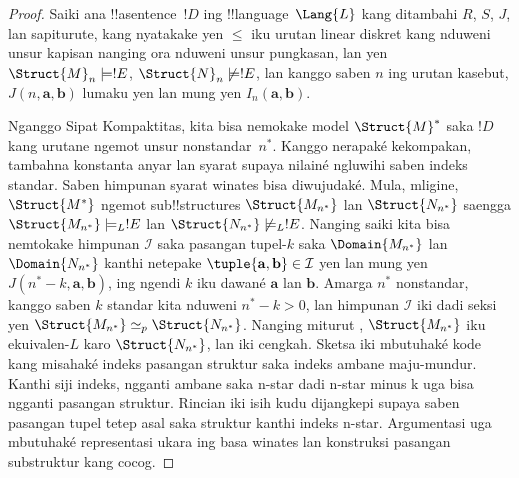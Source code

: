 \documentclass[../../../include/open-logic-section]{subfiles}
\begin{document}
\begin{proof}
Saiki ana !!a{sentence}~$!D$ ing !!{language}~$\Lang{L}$ kang
ditambahi $R$, $S$, $J$, lan sapiturute, kang nyatakake yen
$\le$ iku urutan linear diskret kang nduweni unsur kapisan
nanging ora nduweni unsur pungkasan, lan yen
$\Struct{M}_n \models !E$, $\Struct{N}_n \not\models !E$,
lan kanggo saben $n$ ing urutan kasebut,
$J(n, \mathbf{a}, \mathbf{b})$ lumaku yen lan mung yen
$I_n(\mathbf{a}, \mathbf{b})$.

Nganggo Sipat Kompaktitas, kita bisa nemokake model
$\Struct{M}^*$ saka $!D$ kang urutane ngemot unsur
nonstandar~$n^*$. Kanggo nerapaké kekompakan, tambahna konstanta anyar lan syarat supaya nilainé ngluwihi saben indeks standar. Saben himpunan syarat winates bisa diwujudaké. Mula, mligine, $\Struct{M^*}$ ngemot
sub!!{structure}s $\Struct{M_{n^*}}$ lan
$\Struct{N_{n^*}}$ saengga $\Struct{M_{n^*}}
\models_L !E$ lan $\Struct{N_{n^*}} \not\models_L !E$.
Nanging saiki kita bisa nemtokake himpunan $\mathcal{I}$
saka pasangan tupel-$k$ saka $\Domain{M_{n^*}}$ lan
$\Domain{N_{n^*}}$ kanthi netepake
$\tuple{\mathbf{a}, \mathbf{b}} \in \mathcal{I}$ yen lan mung
yen $J(n^*-k, \mathbf{a}, \mathbf{b})$, ing ngendi $k$
iku dawané $\mathbf{a}$ lan $\mathbf{b}$. Amarga $n^*$
nonstandar, kanggo saben $k$ standar kita nduweni
$n^* - k >0$, lan himpunan $\mathcal{I}$ iki dadi seksi
yen $\Struct{M_{n^*}} \simeq_p
\Struct{N_{n^*}}$. Nanging miturut
, $\Struct{M_{n^*}}$
iku ekuivalen-$L$ karo $\Struct{N_{n^*}}$, lan iki cengkah. Sketsa iki mbutuhaké kode kang misahaké indeks pasangan struktur saka indeks ambane maju-mundur. Kanthi siji indeks, ngganti ambane saka n-star dadi n-star minus k uga bisa ngganti pasangan struktur. Rincian iki isih kudu dijangkepi supaya saben pasangan tupel tetep asal saka struktur kanthi indeks n-star. Argumentasi uga mbutuhaké representasi ukara ing basa winates lan konstruksi pasangan substruktur kang cocog.
\end{proof}
\end{document}
